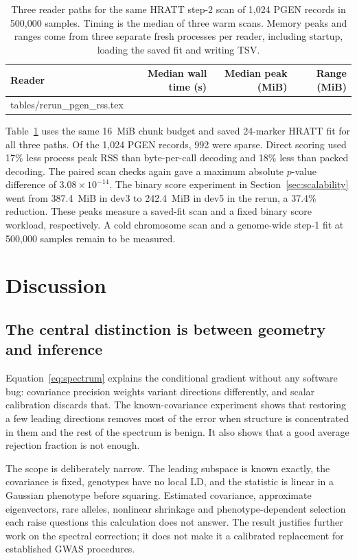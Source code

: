 \documentclass[11pt]{article}
\makeatletter
\newcommand{\tabinput}[1]{\@@input #1 }
\makeatother
\begin{document}
\begin{table}[htbp]
 \centering\small
 \caption{Three reader paths for the same HRATT step-2 scan of 1,024
 PGEN records in 500,000 samples. Timing is the median of three warm scans.
 Memory peaks and ranges come from three separate fresh processes per
 reader, including startup, loading the saved fit and writing TSV.}
 \label{tab:rerun-pgen-rss}
 \begin{tabular}{@{}lrrr@{}}
 \toprule
 Reader & Median wall time (s) & Median peak (MiB) & Range (MiB) \\
 \midrule
 \tabinput{tables/rerun_pgen_rss.tex}
 \bottomrule
 \end{tabular}
\end{table}

Table~\ref{tab:rerun-pgen-rss} uses the same 16~MiB chunk budget and
saved 24-marker HRATT fit for all three paths. Of the 1,024 PGEN
records, 992 were sparse. Direct scoring used 17\% less process peak RSS
than byte-per-call decoding and 18\% less than packed decoding. The
paired scan checks again gave a maximum absolute $p$-value difference
of $3.08\times10^{-14}$. The binary score experiment in
Section~\ref{sec:scalability} went from 387.4~MiB in dev3 to 242.4~MiB in
dev5 in the rerun, a 37.4\% reduction. These peaks measure a saved-fit
scan and a fixed binary score workload, respectively. A cold chromosome
scan and a genome-wide step-1 fit at 500,000 samples remain to be measured.

\FloatBarrier

\section{Discussion}

\subsection{The central distinction is between geometry and inference}

Equation~\eqref{eq:spectrum} explains the conditional gradient without
any software bug: covariance precision weights variant directions
differently, and scalar calibration discards that. The known-covariance
experiment shows that restoring a few leading directions removes most of
the error when structure is concentrated in them and the rest of the
spectrum is benign. It also shows that a good average rejection fraction
is not enough.

The scope is deliberately narrow. The leading subspace is known exactly,
the covariance is fixed, genotypes have no local LD, and the statistic is
linear in a Gaussian phenotype before squaring. Estimated covariance,
approximate eigenvectors, rare alleles, nonlinear shrinkage and
phenotype-dependent selection each raise questions this calculation does
not answer. The result justifies further work on the spectral correction;
it does not make it a calibrated replacement for established GWAS
procedures.
\end{document}
